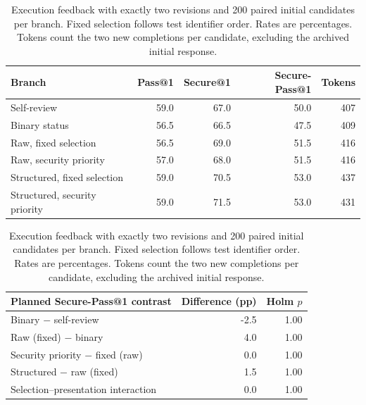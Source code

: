 \begin{table}[pos=htbp]
\centering
\caption{Execution feedback with exactly two revisions and 200 paired initial candidates per branch. Fixed selection follows test identifier order. Rates are percentages. Tokens count the two new completions per candidate, excluding the archived initial response.}
\label{tab:supp-fixed-calls}
\begin{tabular}{lrrrr}
\toprule
Branch & Pass@1 & Secure@1 & \textbf{Secure-Pass@1} & Tokens \\
\midrule
Self-review & 59.0 & 67.0 & 50.0 & 407 \\
Binary status & 56.5 & 66.5 & 47.5 & 409 \\
Raw, fixed selection & 56.5 & 69.0 & 51.5 & 416 \\
Raw, security priority & 57.0 & 68.0 & 51.5 & 416 \\
Structured, fixed selection & 59.0 & 70.5 & 53.0 & 437 \\
Structured, security priority & 59.0 & 71.5 & 53.0 & 431 \\
\bottomrule
\end{tabular}
\medskip
\begin{tabular}{lrr}
\toprule
Planned Secure-Pass@1 contrast & Difference (pp) & Holm $p$ \\
\midrule
Binary $-$ self-review & -2.5 & 1.00 \\
Raw (fixed) $-$ binary & 4.0 & 1.00 \\
Security priority $-$ fixed (raw) & 0.0 & 1.00 \\
Structured $-$ raw (fixed) & 1.5 & 1.00 \\
Selection--presentation interaction & 0.0 & 1.00 \\
\bottomrule
\end{tabular}
\end{table}
